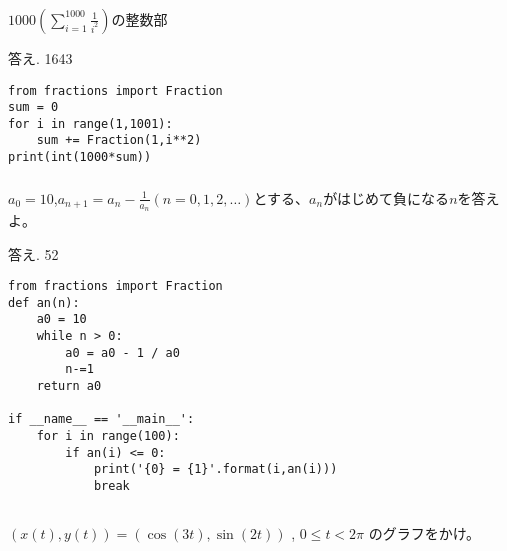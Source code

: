 \documentclass[12pt,a4paper]{jsarticle}
\begin{document}
\subsubsection{}
$\displaystyle1000(\sum_{i=1}^{1000} \frac{1}{i^{2}})$の整数部\par
答え. 1643
\begin{lstlisting}
from fractions import Fraction
sum = 0
for i in range(1,1001):
    sum += Fraction(1,i**2)
print(int(1000*sum))
\end{lstlisting}
\subsubsection{}
$a_0 = 10$,$\displaystyle a_{n+1} = a_n - \frac{1}{a_n}$$(n=0,1,2,\dots)$とする、$a_n$がはじめて負になる$n$を答えよ。\par
答え. 52
\begin{lstlisting}
from fractions import Fraction
def an(n):
    a0 = 10
    while n > 0:
        a0 = a0 - 1 / a0
        n-=1
    return a0

if __name__ == '__main__':
    for i in range(100):
        if an(i) <= 0:
            print('{0} = {1}'.format(i,an(i)))
            break
\end{lstlisting}

\subsection{}
$(x(t),y(t)) = (\cos(3t),\sin(2t))$ , $0 \leq t < 2 \pi$ のグラフをかけ。
\end{document}
